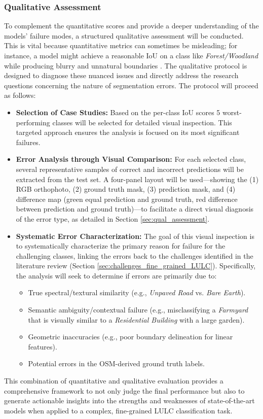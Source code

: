 \documentclass{report}
\begin{document}
\subsubsection{Qualitative Assessment}
To complement the quantitative scores and provide a deeper understanding of the models' failure modes, a structured qualitative assessment will be conducted. This is vital because quantitative metrics can sometimes be misleading; for instance, a model might achieve a reasonable IoU on a class like \textit{Forest/Woodland} while producing blurry and unnatural boundaries \parencite [p.~10.]{KaiserEtAlLearningAerialImageSegmentationOnlineMaps2017}. The qualitative protocol is designed to diagnose these nuanced issues and directly address the research questions concerning the nature of segmentation errors.
The protocol will proceed as follows:
\begin{itemize}
    \item\textbf{Selection of Case Studies:} Based on the per-class IoU scores 5 worst-performing classes will be selected for detailed visual inspection. This targeted approach ensures the analysis is focused on its most significant failures.
    \item\textbf{Error Analysis through Visual Comparison:} For each selected class, several representative samples of correct and incorrect predictions will be extracted from the test set. A four-panel layout will be used—showing the (1) RGB orthophoto, (2) ground truth mask, (3) prediction mask, and (4) difference map (green equal prediction and ground truth, red difference between prediction and ground truth)—to facilitate a direct visual diagnosis of the error type, as detailed in Section \ref{sec:qual_assessment}.
    \item \textbf{Systematic Error Characterization:} The goal of this visual inspection is to systematically characterize the primary reason for failure for the challenging classes, linking the errors back to the challenges identified in the literature review (Section \ref{sec:challenges_fine_grained_LULC}). Specifically, the analysis will seek to determine if errors are primarily due to:
    \begin{itemize}
        \item True spectral/textural similarity (e.g., \textit{Unpaved Road} vs. \textit{Bare Earth}).
        \item Semantic ambiguity/contextual failure (e.g., misclassifying a \textit{Farmyard} that is visually similar to a \textit{Residential Building} with a large garden).
         \item  Geometric inaccuracies (e.g., poor boundary delineation for linear features).
        \item Potential errors in the OSM-derived ground truth labels.
    \end{itemize}    
\end{itemize}
This combination of quantitative and qualitative evaluation provides a comprehensive framework to not only judge the final performance but also to generate actionable insights into the strengths and weaknesses of state-of-the-art models when applied to a complex, fine-grained LULC classification task.
\end{document}
